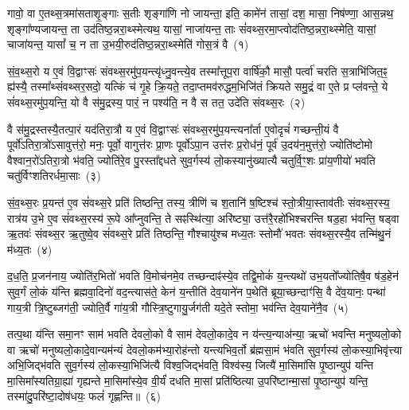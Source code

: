 \setcounter{anuvakam}{0}
गावो॒ वा ए॒तथ्स॒त्रमा॑सताशृ॒ङ्गाः स॒तीः शृङ्गा॑णि नो जायन्ता॒ इति॒ कामे॑न॑ तासां॒ दश॒ मासा॒ निष॑ण्णा॒ आस॒न्नथ॒ शृङ्गा᳚ण्यजायन्त॒ ता उद॑तिष्ठ॒न्नरा॒थ्स्मेत्यथ॒ यासां॒ नाजा॑यन्त॒ ताः सं॑वथ्स॒रमा॒प्त्वोद॑तिष्ठ॒न्नरा॒थ्स्मेति॒ यासां॒ चाजा॑यन्त॒ यासां᳚ च॒ न ता उ॒भयी॒रुद॑तिष्ठ॒न्नरा॒थ्स्मेति॑ गोस॒त्रं वै~(१)

सं॒व॒थ्स॒रो य ए॒वं वि॒द्वाꣳसः॑ संवथ्स॒रमु॑प॒यन्त्यृ॑ध्नु॒वन्त्ये॒व तस्मा᳚त्तूप॒रा वार्\mbox{}षि॑कौ॒ मासौ॒ पर्त्वा॑ चरति स॒त्राभि॑जित॒ꣴ॒ ह्य॑स्यै॒ तस्मा᳚थ्संवथ्सर॒सदो॒ यत्किं च॑ गृ॒हे क्रि॒यते॒ तदा॒प्तमव॑रुद्धम॒भिजि॑तं क्रियते समु॒द्रं वा ए॒ते प्र प्ल॑वन्ते॒ ये सं॑वथ्स॒रमु॑प॒यन्ति॒ यो वै स॑मु॒द्रस्य॒ पारं॒ न पश्य॑ति॒ न वै स तत॒ उदे॑ति संवथ्स॒रः~(२)

वै स॑मु॒द्रस्तस्यै॒तत्पा॒रं यद॑तिरा॒त्रौ य ए॒वं वि॒द्वाꣳसः॑ संवथ्स॒रमु॑प॒यन्त्यना᳚र्ता ए॒वोदृचं॑ गच्छन्ती॒यं वै पूर्वो॑\-ऽतिरा॒त्रो॑\-ऽ\-सावुत्त॑रो॒ मनः॒ पूर्वो॒ वागुत्त॑रः प्रा॒णः पूर्वो॑\-ऽपा॒न उत्त॑रः प्र॒रोध॑नं॒ पूर्व॑ उ॒दय॑न॒मुत्त॑रो॒ ज्योति॑ष्टोमो वैश्वान॒रो॑\-ऽतिरा॒त्रो भ॑वति॒ ज्योति॑रे॒व पु॒रस्ता᳚द्दधते सुव॒र्गस्य॑ लो॒कस्यानु॑ख्यात्यै चतुर्वि॒ꣳ॒शः प्रा॑य॒णीयो॑ भवति चतु॑र्विꣳशतिरर्धमा॒साः~(३)

सं॒व॒थ्स॒रः प्र॒यन्त॑ ए॒व सं॑वथ्स॒रे प्रति॑ तिष्ठन्ति॒ तस्य॒ त्रीणि॑ च श॒तानि॑ ष॒ष्टिश्च॑ स्तो॒त्रीया॒स्ताव॑तीः संवथ्स॒रस्य॒ रात्र॑य उ॒भे ए॒व सं॑वथ्स॒रस्य॑ रू॒पे आ᳚प्नुवन्ति॒ ते सꣴस्थि॑त्या॒ अरि॑ष्ट्या॒ उत्त॑रै॒रहो॑भिश्चरन्ति षड॒हा भ॑वन्ति॒ षड्वा ऋ॒तवः॑ संवथ्स॒र ऋ॒तुष्वे॒व सं॑वथ्स॒रे प्रति॑ तिष्ठन्ति॒ गौश्चायु॑श्च मध्य॒तः स्तोमौ॑ भवतः संवथ्स॒रस्यै॒व तन्मि॑थु॒नं म॑ध्य॒तः~(४)

द॒ध॒ति॒ प्र॒जन॑नाय॒ ज्योति॑र॒भितो॑ भवति वि॒मोच॑नमे॒व तच्छन्दाꣴ॑स्ये॒व तद्वि॒मोकं॑ य॒न्त्यथो॑ उभ॒यतो᳚ज्योतिषै॒व ष॑ड॒हेन॑ सुव॒र्गं लो॒कं य॑न्ति ब्रह्मवा॒दिनो॑ वद॒न्त्यास॑ते॒ केन॑ य॒न्तीति॑ देव॒याने॑न प॒थेति॑ ब्रूया॒च्छन्दाꣳ॑सि॒ वै दे॑व॒यानः॒ पन्था॑ गाय॒त्री त्रि॒ष्टुब्जग॑ती॒ ज्योति॒र्वै गा॑य॒त्री गौस्त्रि॒ष्टुगायु॒र्जग॑ती यदे॒ते स्तोमा॒ भव॑न्ति देव॒याने॑नै॒व~(५)

तत्प॒था य॑न्ति समा॒नꣳ साम॑ भवति देवलो॒को वै साम॑ देवलो॒कादे॒व न य॑न्त्य॒न्याअ॑न्या॒ ऋचो॑ भवन्ति मनुष्यलो॒को वा ऋचो॑ मनुष्यलो॒कादे॒वान्यम॑न्यं देवलो॒कम॑भ्या॒रोह॑न्तो यन्त्यभिव॒र्तो ब्र॑ह्मसा॒मं भ॑वति सुव॒र्गस्य॑ लो॒कस्या॒भिवृ॑त्त्या अभि॒जिद्भ॑वति सुव॒र्गस्य॑ लो॒कस्या॒भिजि॑त्यै विश्व॒जिद्भ॑वति॒ विश्व॑स्य॒ जित्यै॑ मा॒सिमा॑सि पृ॒ष्ठान्युप॑ यन्ति मा॒सिमा᳚स्यतिग्रा॒ह्या॑ गृह्यन्ते मा॒सिमा᳚स्ये॒व वी॒र्यं॑ दधति मा॒सां प्रति॑ष्ठित्या उ॒परि॑ष्टान्मा॒सां पृ॒ष्ठान्युप॑ यन्ति॒ तस्मा॑दु॒परि॑ष्टा॒दोष॑धयः॒ फलं॑ गृह्णन्ति॥~(६)

